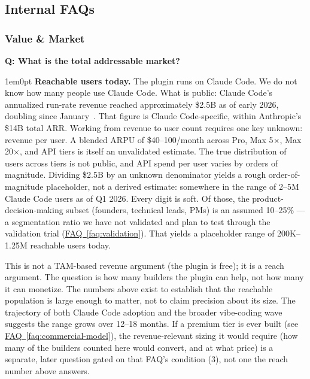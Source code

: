 \documentclass[11pt,letterpaper]{article}
\newcounter{faqnum}
\newenvironment{faqpair}[1]{%
  \needspace{4\baselineskip}%
  \vspace{0.5em}%
  \refstepcounter{faqnum}%
  \noindent\textbf{\color{SectionBlue}Q\thefaqnum: #1}\par\nopagebreak[4]%
  \vspace{0.2em}%
  \begin{adjustwidth}{1em}{0pt}%
  \setlength{\parindent}{0pt}%
}{%
  \end{adjustwidth}%
  \vspace{0.5em}%
}
\newcommand{\faqref}[1]{\hyperref[#1]{FAQ~\ref*{#1}}}
\begin{document}

\newpage
\subsection*{Internal FAQs}

\subsubsection*{Value \& Market}

\begin{faqpair}{What is the total addressable market?}\label{faq:tam}
  \textbf{Reachable users today.} The plugin runs on Claude Code. We do not know how many people use Claude Code. What is public: Claude Code's annualized run-rate revenue reached approximately \$2.5B as of early 2026, doubling since January~\cite{anthropic2026revenue}. That figure is Claude Code-specific, within Anthropic's \$14B total ARR. Working from revenue to user count requires one key unknown: revenue per user. A blended ARPU of \$40--100/month across Pro, Max 5$\times$, Max 20$\times$, and API tiers is itself an unvalidated estimate. The true distribution of users across tiers is not public, and API spend per user varies by orders of magnitude. Dividing \$2.5B by an unknown denominator yields a rough order-of-magnitude placeholder, not a derived estimate: somewhere in the range of 2--5M Claude Code users as of Q1 2026. Every digit is soft. Of those, the product-decision-making subset (founders, technical leads, PMs) is an assumed 10--25\% --- a segmentation ratio we have not validated and plan to test through the validation trial (\faqref{faq:validation}). That yields a placeholder range of 200K--1.25M reachable users today.

  This is not a TAM-based revenue argument (the plugin is free); it is a reach argument. The question is how many builders the plugin can help, not how many it can monetize. The numbers above exist to establish that the reachable population is large enough to matter, not to claim precision about its size. The trajectory of both Claude Code adoption and the broader vibe-coding wave suggests the range grows over 12--18 months. If a premium tier is ever built (see \faqref{faq:commercial-model}), the revenue-relevant sizing it would require (how many of the builders counted here would convert, and at what price) is a separate, later question gated on that FAQ's condition (3), not one the reach number above answers.


\end{faqpair}
\end{document}
